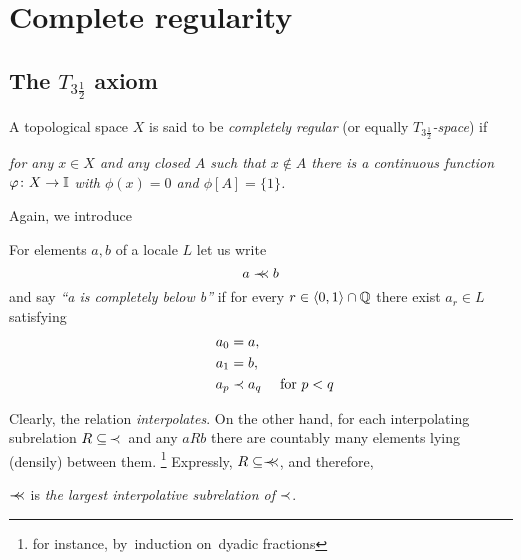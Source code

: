 \chapter{Complete regularity}

\section{The $T_{3\frac{1}{2}}$ axiom}

\begin{framed}
  \begin{df}[$T_{3\frac{1}{2}}$]
    A topological space $X$ is said to be \emph{completely regular\/} (or
    equally \emph{$T_{3\frac{1}{2}}$-space\/}) if
    \begin{center} \it
      for any $x\in X$ and any closed $A$ such that $x\not\in A$ there is a
      continuous function $\varphi\colon X \to \mathbb{I}$ with $\phi(x) = 0$ and $\phi[A]
      = \{1\}$.
    \end{center}
  \end{df}
\end{framed}

Again, we introduce

\begin{framed}
  \begin{nota}[$\cb$]
    For elements $a, b$ of a locale $L$ let us write
    \[
      a \prec\mkern-8mu\prec b
    \]
    and say \emph{``a is completely below b''\/} if for every $r\in \langle 0,
    1 \rangle \cap \mathbb{Q}$ there exist $a_r\in L$ satisfying
    \begin{align*}
      a_0 &= a, \\
      a_1 &= b, \\
      \qquad a_p &\prec a_q \quad \text{ for } p < q
    \end{align*}
  \end{nota}
\end{framed}

\begin{rem} \label{cb-largest-interpol}
  Clearly, the relation \emph{interpolates\/}.
  On the other hand, for each interpolating subrelation $R\subseteq \, \prec \, $
  and any $a R b$ there are countably many elements lying (densily) between
  them.\thinspace%
  \footnote{for instance, by~induction on~dyadic fractions}
  Expressly, $R\subseteq \prec\mkern-8mu\prec$, and therefore,
  \begin{center}
    $\cb$ is \emph{the largest interpolative subrelation of $\prec$\/}.
  \end{center}
\end{rem}

